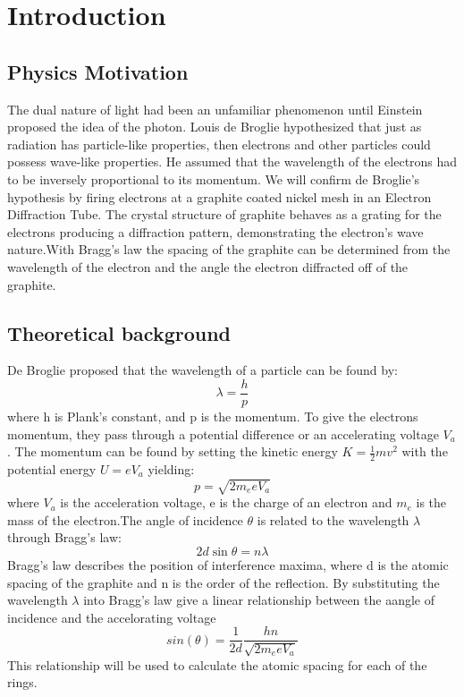 \documentclass[11pt,letterpaper,onecolumn]{article}
\begin{document}
\section{Introduction}

\subsection{Physics Motivation}

The dual nature of light had been an unfamiliar phenomenon until Einstein proposed the idea of the photon. Louis de Broglie hypothesized that just as radiation has particle-like properties, then electrons and other particles could possess wave-like properties. He assumed that the wavelength of the electrons had to be inversely proportional to its momentum. We will confirm de Broglie's hypothesis by firing electrons at a graphite coated nickel mesh in an Electron Diffraction Tube. The crystal structure of graphite behaves as a grating for the electrons producing a diffraction pattern, demonstrating the electron's wave nature.With Bragg's law the spacing of the graphite can be determined from the wavelength of the electron and the angle the electron diffracted off of the graphite.~\cite{Bas,Nave} 

\subsection{Theoretical background}

De Broglie proposed that the wavelength of a particle can be found by:
$$\lambda = \frac{h}{p}$$
where h is Plank's constant, and p is the momentum. To give the electrons momentum, they pass through a potential difference or an accelerating voltage $V_a$. The momentum can be found by setting the kinetic energy $K=\frac{1}{2}mv^2$ with the potential energy $U=eV_a$ yielding:
$$p = \sqrt{2m_{e}eV_{a}}$$
where $V_{a}$ is the acceleration voltage, e is the charge of an electron and $m_{e}$ is the mass of the electron.The angle of incidence $\theta$ is related to the wavelength $\lambda$ through Bragg's law: 
$$2d\sin{\theta}=n\lambda$$
Bragg's law describes the position of interference maxima, where d is the atomic spacing of the graphite and n is the order of the reflection. By substituting the wavelength $\lambda$ into Bragg's law give a linear relationship between the aangle of incidence and the accelorating voltage
$$sin(\theta)=\frac{1}{2d}\frac{hn}{\sqrt{2m_{e}eV_{a}}}$$
This relationship will be used to calculate the atomic spacing for each of the rings.
\end{document}
